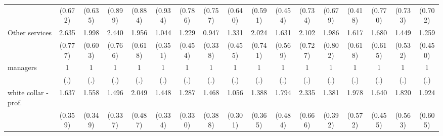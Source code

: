 {\begin{tabular}{l*{16}{c}}
                    &     (0.672)         &     (0.635)         &     (0.899)         &     (0.884)         &     (0.934)         &     (0.786)         &     (0.757)         &     (0.640)         &     (0.591)         &     (0.454)         &     (0.734)         &     (0.679)         &     (0.418)         &     (0.770)         &     (0.733)         &     (0.702)         \\
[1em]
Other services      &       2.635\sym{**} &       1.998\sym{*}  &       2.440\sym{**} &       1.956\sym{*}  &       1.044         &       1.229         &       0.947         &       1.331         &       2.024         &       1.631         &       2.102\sym{*}  &       1.986         &       1.617         &       1.680         &       1.449         &       1.259         \\
                    &     (0.777)         &     (0.603)         &     (0.766)         &     (0.618)         &     (0.351)         &     (0.454)         &     (0.338)         &     (0.455)         &     (0.741)         &     (0.569)         &     (0.727)         &     (0.802)         &     (0.618)         &     (0.615)         &     (0.532)         &     (0.450)         \\
[1em]
managers            &           1         &           1         &           1         &           1         &           1         &           1         &           1         &           1         &           1         &           1         &           1         &           1         &           1         &           1         &           1         &           1         \\
                    &         (.)         &         (.)         &         (.)         &         (.)         &         (.)         &         (.)         &         (.)         &         (.)         &         (.)         &         (.)         &         (.)         &         (.)         &         (.)         &         (.)         &         (.)         &         (.)         \\
[1em]
white collar - prof.&       1.637\sym{*}  &       1.558\sym{*}  &       1.496         &       2.049\sym{**} &       1.448         &       1.287         &       1.468         &       1.056         &       1.388         &       1.794\sym{*}  &       2.335\sym{**} &       1.381         &       1.978\sym{*}  &       1.640         &       1.820         &       1.924\sym{*}  \\
                    &     (0.359)         &     (0.349)         &     (0.337)         &     (0.487)         &     (0.334)         &     (0.330)         &     (0.388)         &     (0.301)         &     (0.365)         &     (0.484)         &     (0.666)         &     (0.392)         &     (0.572)         &     (0.455)         &     (0.563)         &     (0.605)         \\

\end{tabular}}
